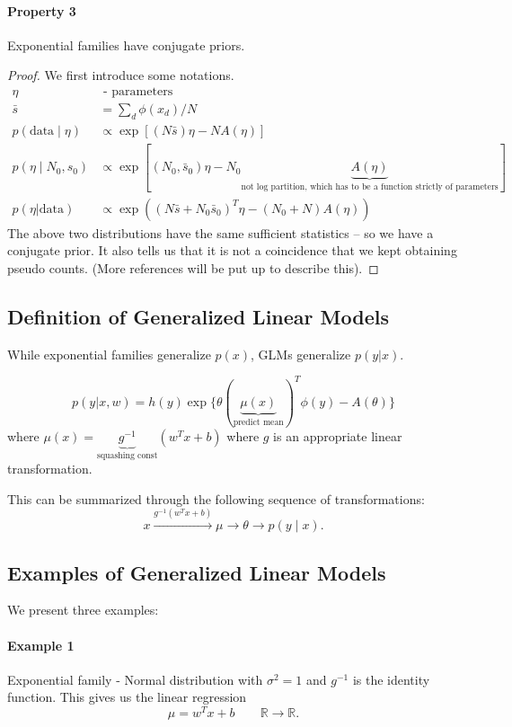 \documentclass{article}
\begin{document}
\paragraph{Property 3} Exponential families have conjugate priors.

\begin{proof}
We first introduce some notations. 
\begin{align*}
\eta &\text{ - parameters}
\\
\bar{s} &= \sum_d\phi(x_d) / N
\\
p(\text{data} \mid \eta) &\propto \exp [(N \bar s) \eta - N A(\eta)]
\\
p(\eta \mid N_0, s_0) &\propto \exp[ (N_0, \bar s_0) \eta - N_0 \underbrace{A(\eta)}_{\text{not log partition, which has to be a function strictly of parameters}}]
\\
p(\eta | \text{data}) &\propto \exp((N\bar{s} + N_0\bar{s}_0)^T\eta - (N_0 + N)A(\eta))
\end{align*}
The above two distributions have the same sufficient statistics -- so we have a conjugate prior. It also tells us that it is not a coincidence that we kept obtaining pseudo counts. (More references will be put up to describe this). 

\end{proof}

\subsection{Definition of Generalized Linear Models}

While exponential families generalize $p(x)$, GLMs generalize $p(y|x)$.

\[
p(y | x,w) = h(y)\exp\{\theta(\underbrace{\mu(x)}_{\text{predict mean}})^T\phi(y) - A(\theta)\}
\]
where $\mu(x) = \underbrace{g^{-1}}_{\text{squashing const}}(w^Tx + b)$
where $g$ is an appropriate linear transformation.

This can be summarized through the following sequence of transformations:
$$
x \overset{g^{-1}(w^T x + b)}{\longrightarrow} \mu \to \theta \to p(y \mid x).
$$

\subsection{Examples of Generalized Linear Models}
We present three examples:
\paragraph{Example 1} Exponential family - Normal distribution with $\sigma^2 = 1$ and $g^{-1}$ is the identity function.
This gives us the linear regression
$$
\mu = w^Tx + b \qquad \mathbb{R} \to \mathbb{R}.
$$
\end{document}
